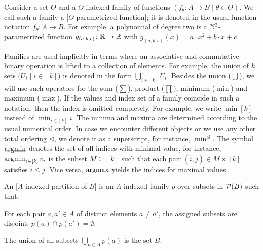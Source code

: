 \documentclass[../document.tex]{subfiles}
\begin{document}
    Consider a set \(\varTheta\) and a \(\varTheta\)-indexed family of functions \((f_\theta\colon A \to B\mid \theta \in \varTheta)\).
    We call such a family a [$\varTheta$-parametrized function]; it is denoted in the usual function notation \(f_\theta\colon A \to B\).
    For example, a polynomial of degree two is a \(\mathbb{N}^3\)-parametrized function \(g_{(a,b,c)}\colon \mathbb{R} \to \mathbb{R}\) with \(g_{(a,b,c)}(x) = a\cdot x^2 + b\cdot x + c\).

    Families are used implicitly in terms where an associative and commutative binary operation is lifted to a collection of elements.
    For example, the union of \(k\) sets \(\big(U_i \mid i \in [k]\big)\) is denoted in the form \(\bigcup_{i \in [k]} U_i\).
    Besides the union (\(\bigcup\)), we will use such operators for the sum (\(\sum\)), product (\(\prod\)), minimum (\(\min\)) and maximum (\(\max\)).
    If the values and index set of a family coincide in such a notation, then the index is omitted completely.
    For example, we write \(\min [k]\) instead of \(\min_{i \in [k]} i\).
    The minima and maxima are determined according to the usual numerical order.
    In case we encounter different objects or we use any other total ordering \(\unlhd\), we denote it as a superscript, for instance, \(\min^{\unlhd}\).
    The symbol \(\operatorname{arg min}\) denotes the set of all indices with minimal value, for instance, \(\operatorname{arg min}_{i \in [k]} v_i\) is the subset \(M \subseteq [k]\) such that each pair \((\hat{i}, j) \in M \times [k]\) satisfies \(\hat{i} \leq j\).
    Vice versa, \(\operatorname{arg max}\) yields the indices for maximal values.

    An [\(A\)-indexed partition of \(B\)] is an \(A\)-indexed family \(p\) over subsets in \(\mathcal{P}(B)\) such that:
    \begin{inparaenum}
        \item For each pair \(a, a' \in A\) of distinct elements \(a \neq a'\), the assigned subsets are disjoint: \(p(a) \cap p(a') = \emptyset\).
        \item The union of all subsets \(\bigcup_{a \in A} p(a)\) is the set \(B\).
    \end{inparaenum}
\end{document}
